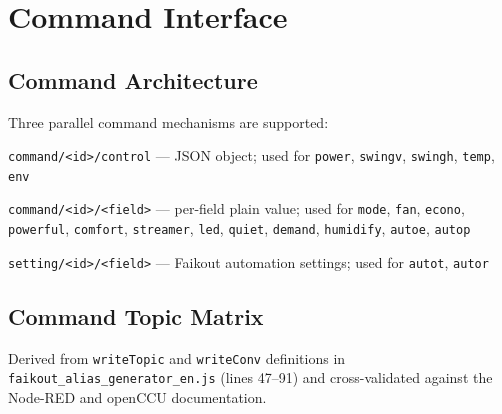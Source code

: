 \documentclass[11pt,a4paper]{article}
\newcommand{\topic}[1]{\texttt{\color{accent}#1}}
\newcommand{\field}[1]{\texttt{\color{codegreen}#1}}
\begin{document}
\section{Command Interface}

\subsection{Command Architecture}

Three parallel command mechanisms are supported:

\begin{description}[leftmargin=2.5cm, style=nextline]
  \item[Mechanism A] \topic{command/\textless id\textgreater/control} — JSON object; used for \field{power}, \field{swingv}, \field{swingh}, \field{temp}, \field{env}
  \item[Mechanism B] \topic{command/\textless id\textgreater/\textless field\textgreater} — per-field plain value; used for \field{mode}, \field{fan}, \field{econo}, \field{powerful}, \field{comfort}, \field{streamer}, \field{led}, \field{quiet}, \field{demand}, \field{humidify}, \field{autoe}, \field{autop}
  \item[Mechanism C] \topic{setting/\textless id\textgreater/\textless field\textgreater} — Faikout automation settings; used for \field{autot}, \field{autor}
\end{description}

\subsection{Command Topic Matrix}

Derived from \texttt{writeTopic} and \texttt{writeConv} definitions in \texttt{faikout\_alias\_generator\_en.js} (lines 47–91) and cross-validated against the Node-RED and openCCU documentation.
\end{document}
